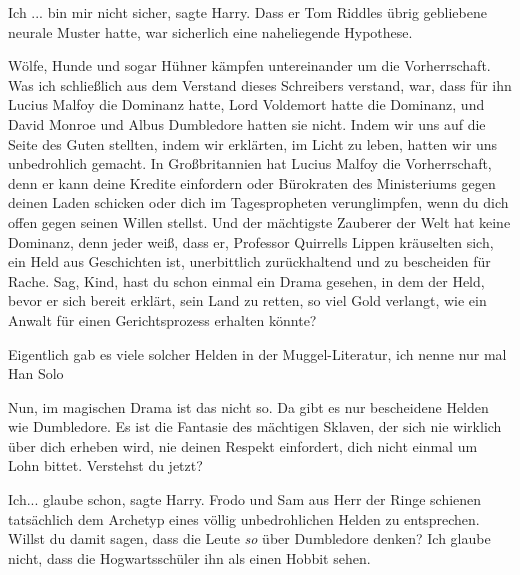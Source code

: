 \glqq{}Ich ... bin mir nicht sicher\grqq{}, sagte Harry. Dass er Tom Riddles
übrig gebliebene neurale Muster hatte, war sicherlich eine naheliegende
Hypothese.

\glqq{}Wölfe, Hunde und sogar Hühner kämpfen untereinander um die Vorherrschaft.
Was ich schließlich aus dem Verstand dieses Schreibers verstand, war, dass für
ihn Lucius Malfoy die Dominanz hatte, Lord Voldemort hatte die Dominanz, und
David Monroe und Albus Dumbledore hatten sie nicht. Indem wir uns auf die Seite
des Guten stellten, indem wir erklärten, im Licht zu leben, hatten wir uns
unbedrohlich gemacht. In Großbritannien hat Lucius Malfoy die Vorherrschaft,
denn er kann deine Kredite einfordern oder Bürokraten des Ministeriums gegen
deinen Laden schicken oder dich im Tagespropheten verunglimpfen, wenn du dich
offen gegen seinen Willen stellst. Und der mächtigste Zauberer der Welt hat
keine Dominanz, denn jeder weiß, dass er\grqq{}, Professor Quirrells Lippen
kräuselten sich, \glqq{}ein Held aus Geschichten ist, unerbittlich zurückhaltend
und zu bescheiden für Rache. Sag, Kind, hast du schon einmal ein Drama gesehen,
in dem der Held, bevor er sich bereit erklärt, sein Land zu retten, so viel Gold
verlangt, wie ein Anwalt für einen Gerichtsprozess erhalten könnte?\grqq{}

\glqq{}Eigentlich gab es viele solcher Helden in der Muggel-Literatur, ich nenne
nur mal Han Solo\grqq{}

\glqq{}Nun, im magischen Drama ist das nicht so. Da gibt es nur bescheidene
Helden wie Dumbledore. Es ist die Fantasie des mächtigen Sklaven, der sich nie
wirklich über dich erheben wird, nie deinen Respekt einfordert, dich nicht
einmal um Lohn bittet. Verstehst du jetzt?\grqq{}

\glqq{}Ich... glaube schon\grqq{}, sagte Harry. Frodo und Sam aus Herr der Ringe
schienen tatsächlich dem Archetyp eines völlig unbedrohlichen Helden zu
entsprechen. \glqq{}Willst du damit sagen, dass die Leute \emph{so} über
Dumbledore denken? Ich glaube nicht, dass die Hogwartsschüler ihn als einen
Hobbit sehen.\grqq{}

